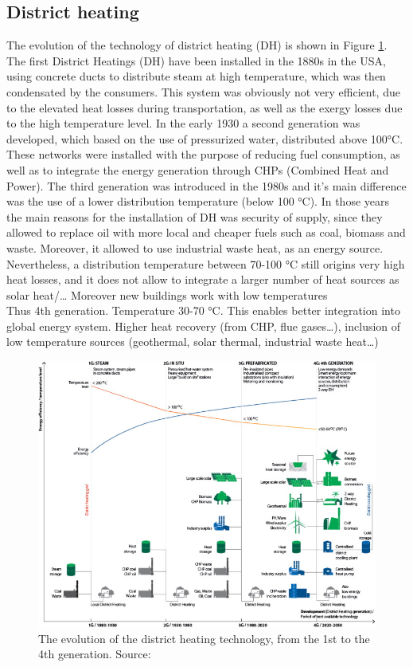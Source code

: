 \documentclass{article}
\begin{document}
\subsection{District heating}
The evolution of the technology of district heating (DH) is shown in Figure \ref{fig:4GDH}.
The first District Heatings (DH) have been installed in the 1880s in the USA, using concrete ducts to distribute steam at high temperature, which was then condensated by the consumers. This system was obviously not very efficient, due to the elevated heat losses during transportation, as well as the exergy losses due to the high temperature level. In the early 1930 a second generation was developed, which based on the use of pressurized water, distributed above 100\si{\celsius}. These networks were installed with the purpose of reducing fuel consumption, as well as to integrate the energy generation through CHPs (Combined Heat and Power). The third generation was introduced in the 1980s and it's main difference was the use of a lower distribution temperature (below 100 \si{\celsius}). In those years the main reasons for the installation of DH was security of supply, since they allowed to replace oil with more local and cheaper fuels such as coal, biomass and waste. Moreover, it allowed to use industrial waste heat, as an energy source. 
Nevertheless, a distribution temperature between 70-100 \si{\celsius} still origins very high heat losses, and it does not allow to integrate a larger number of heat sources as solar heat/…
Moreover new buildings work with low temperatures\\
Thus 4th generation. Temperature 30-70 \si{\celsius}.
This enables better integration into global energy system. Higher heat recovery (from CHP, flue gases…), inclusion of low temperature sources (geothermal, solar thermal, industrial waste heat…)

\begin{figure}[h!]
\centering
\includegraphics[width=1\textwidth]{4GDH.jpg}
\caption{The evolution of the district heating technology, from the 1st to the 4th generation. Source: \cite{lund4thGenerationDistrict2014}}
\label{fig:4GDH}
\end{figure}
\end{document}
